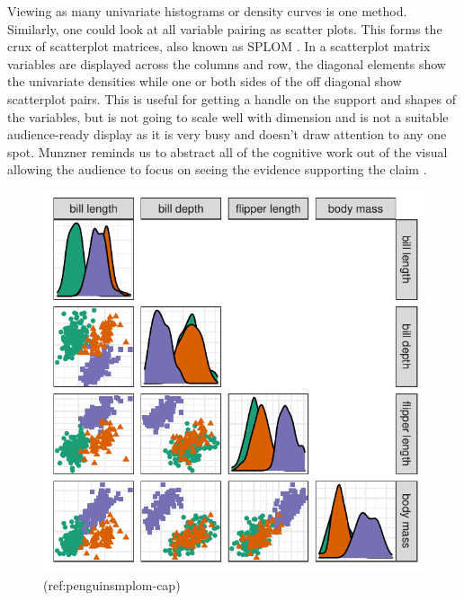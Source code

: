 \documentclass{template/monashthesis}
\begin{document}
Viewing as many univariate histograms or density curves is one method. Similarly, one could look at all variable pairing as scatter plots. This forms the crux of scatterplot matrices, also known as SPLOM \autocite{chambers_graphical_1983}. In a scatterplot matrix variables are displayed across the columns and row, the diagonal elements show the univariate densities while one or both sides of the off diagonal show scatterplot pairs. This is useful for getting a handle on the support and shapes of the variables, but is not going to scale well with dimension and is not a suitable audience-ready display as it is very busy and doesn't draw attention to any one spot. Munzner reminds us to abstract all of the cognitive work out of the visual allowing the audience to focus on seeing the evidence supporting the claim \autocite{munzner_visualization_2014}.



\begin{figure}

{\centering \includegraphics[width=1\linewidth,]{./figures_from_script/ch2_fig1_penguin_splom} 

}

\caption{(ref:penguinsmplom-cap)}\label{fig:penguinsplom}
\end{figure}
\end{document}
